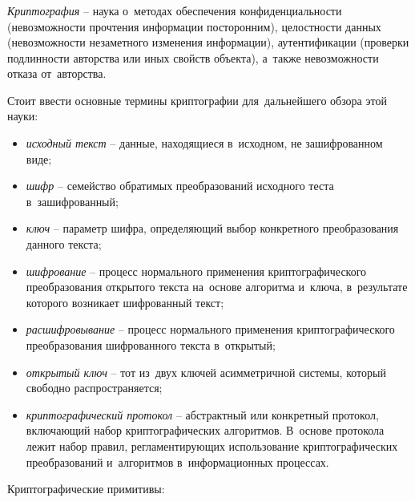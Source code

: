 \subsubsection{}
\label{sec:analysis:research:crypto:general}

\emph{Криптография} -- наука о~методах обеспечения конфиденциальности (невозможности прочтения информации посторонним), целостности данных (невозможности незаметного изменения информации), аутентификации (проверки подлинности авторства или иных свойств объекта), а~также невозможности отказа от~авторства\cite{wiki:crypto}.

Стоит ввести основные термины криптографии для~дальнейшего обзора этой науки:

\begin{itemize}
	\item \emph{исходный текст} -- данные, находящиеся в~исходном, не зашифрованном виде;
	\item \emph{шифр} -- семейство обратимых преобразований исходного теста в~зашифрованный;
	\item \emph{ключ} -- параметр шифра, определяющий выбор конкретного преобразования данного текста;
	\item \emph{шифрование} -- процесс нормального применения криптографического преобразования открытого текста на~основе алгоритма и~ключа, в~результате которого возникает шифрованный текст;
	\item \emph{расшифровывание} -- процесс нормального применения криптографического преобразования шифрованного текста в~открытый;
	\item \emph{открытый ключ} -- тот из~двух ключей асимметричной системы, который свободно распространяется;
	\item \emph{криптографический протокол} -- абстрактный или конкретный протокол, включающий набор криптографических алгоритмов. В~основе протокола лежит набор правил, регламентирующих использование криптографических преобразований и~алгоритмов в~информационных процессах.
\end{itemize}

Криптографические примитивы:

